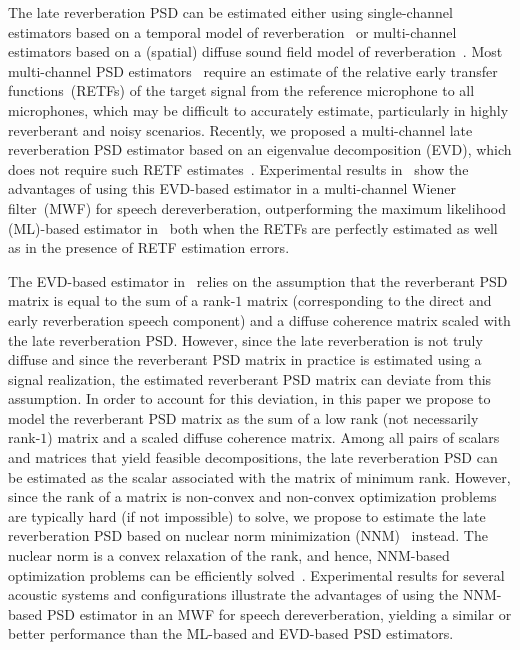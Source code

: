 \documentclass{article}
\begin{document}
The late reverberation PSD can be estimated either using single-channel estimators based on a temporal model of reverberation~\cite{Lebart_ACUSTICA_2001,Habets2009a} or multi-channel estimators based on a (spatial) diffuse sound field model of reverberation~\cite{Braun_EUSIPCO_2013,Kuklasinski_EUSIPCO_2014g,Schwartz_WASPAA_2015,Braun_EURASIP_2015,Schwartz_ICASSP_2016,Kuklasinski_ITASLP_2016,Schwartz_EUSIPCO_2016, Kodrasi_HSCMA_2017, Kodrasi_ICASSP_2017}.
Most multi-channel PSD estimators~\cite{Braun_EUSIPCO_2013,Kuklasinski_EUSIPCO_2014g,Schwartz_WASPAA_2015,Braun_EURASIP_2015,Schwartz_ICASSP_2016,Kuklasinski_ITASLP_2016,Schwartz_EUSIPCO_2016} require an estimate of the relative early transfer functions~(RETFs) of the target signal from the reference microphone to all microphones, which may be difficult to accurately estimate, particularly in highly reverberant and noisy scenarios.
Recently, we proposed a multi-channel late reverberation PSD estimator based on an eigenvalue decomposition (EVD), which does not require such RETF estimates~\cite{Kodrasi_HSCMA_2017,Kodrasi_ICASSP_2017}.
Experimental results in~\cite{Kodrasi_ICASSP_2017} show the advantages of using this EVD-based estimator in a multi-channel Wiener filter~(MWF) for speech dereverberation, outperforming the maximum likelihood (ML)-based estimator in~\cite{Kuklasinski_EUSIPCO_2014g} both when the RETFs are perfectly estimated as well as in the presence of RETF estimation errors. 

The EVD-based estimator in~\cite{Kodrasi_ICASSP_2017} relies on the assumption that the reverberant PSD matrix is equal to the sum of a rank-$1$ matrix (corresponding to the direct and early reverberation speech component) and a diffuse coherence matrix scaled with the late reverberation PSD.
However, since the late reverberation is not truly diffuse and since the reverberant PSD matrix in practice is estimated using a signal realization, the estimated reverberant PSD matrix can deviate from this assumption.
In order to account for this deviation, in this paper we propose to model the reverberant PSD matrix as the sum of a low rank (not necessarily rank-$1$) matrix and a scaled diffuse coherence matrix.
  Among all pairs of scalars and matrices that yield feasible decompositions, the late reverberation PSD can be estimated as the scalar associated with the matrix of minimum rank.
   However, since the rank of a matrix is non-convex and non-convex optimization problems are typically hard (if not impossible) to solve, we propose to estimate the late reverberation PSD based on nuclear norm minimization (NNM)~\cite{Fazel_phd,Candes_ACM_2011, Liu_ITPAMI_2013} instead.
The nuclear norm is a convex relaxation of the rank, and hence, NNM-based optimization problems can be efficiently solved~\cite{Fazel_phd}.
Experimental results for several acoustic systems and configurations illustrate the advantages of using the NNM-based PSD estimator in an MWF for speech dereverberation, yielding a similar or better performance than the ML-based and EVD-based PSD estimators.
\end{document}
